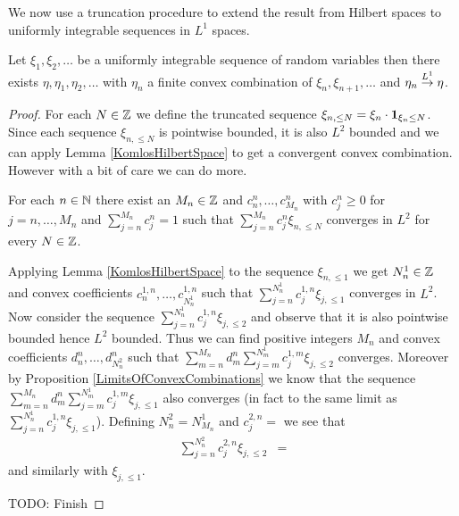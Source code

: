 We now use a truncation procedure to extend the result from Hilbert spaces to uniformly integrable sequences in $L^1$ spaces.
\begin{prop}\label{KomlosUniformlyIntegrable}Let $\xi_1, \xi_2, \dotsc$ be a uniformly integrable sequence of random variables then there exists $\eta, \eta_1, \eta_2, \dotsc$ with $\eta_n$ a finite convex combination of $\xi_n, \xi_{n+1}, \dotsc$  and $\eta_n \overset{L^1}\to \eta$.
\end{prop}
\begin{proof}
For each $N \in \mathbb{Z}$ we define the truncated sequence $\xi_{n, \leq N} = \xi_n \cdot \textbf{1}_{\xi_n \leq N}$.  Since each sequence $\xi_{n, \leq N} $ is pointwise bounded, it is also $L^2$ bounded and we can apply Lemma \ref{KomlosHilbertSpace} to get a convergent convex combination.  However with a bit of care we can do more.
\begin{clm}For each $n \in \mathbb{N}$ there exist an $M_n \in \mathbb{Z}$ and $c^n_{n}, \dotsc, c^n_{M_n}$ with $c^n_j \geq 0$ for $j=n, \dotsc, M_n$ and $\sum_{j=n}^{M_n} c^n_j = 1$ such that $\sum_{j=n}^{M_n} c^n_j \xi_{n, \leq N}$ converges in $L^2$ for every $N \in \mathbb{Z}$.  
\end{clm}
Applying Lemma \ref{KomlosHilbertSpace} to the sequence $\xi_{n, \leq 1}$ we get $N^1_n \in \mathbb{Z}$ and convex coefficients $c^{1,n}_n, \dotsc, c^{1,n}_{N^1_n}$ such that 
$\sum_{j=n}^{N^1_n} c^{1,n}_j \xi_{j, \leq 1}$ converges in $L^2$.  Now consider the sequence $\sum_{j=n}^{N^1_n} c^{1,n}_j \xi_{j, \leq 2}$ and observe that it is also pointwise bounded hence $L^2$ bounded.  Thus we can find positive integers $M_n$ and convex coefficients $d^{n}_n, \dotsc, d^{n}_{N^2_n}$ such that $\sum_{m=n}^{M_n} d^{n}_m \sum_{j=m}^{N^1_m} c^{1,m}_j \xi_{j, \leq 2}$ converges.  Moreover by Proposition \ref{LimitsOfConvexCombinations} we know that the sequence $\sum_{m=n}^{M_n} d^{n}_m \sum_{j=m}^{N^1_m} c^{1,m}_j \xi_{j, \leq 1}$ also converges (in fact to the same limit as $\sum_{j=n}^{N^1_n} c^{1,n}_j \xi_{j, \leq 1}$).  Defining $N^2_n = N^1_{M_n}$ and $c^{2,n}_j = $ we see that 
\begin{align*}
\sum_{j=n}^{N^2_n} c^{2,n}_j \xi_{j, \leq 2} &= 
\end{align*}
and similarly with $\xi_{j, \leq 1}$.

TODO: Finish
\end{proof}